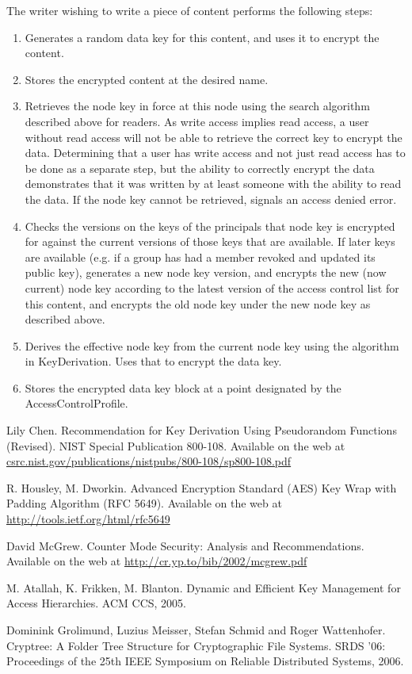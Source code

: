 The writer wishing to write a piece of content performs the following steps:
\begin{enumerate}
\item Generates a random data key for this content, and uses it to encrypt the content.
\item Stores the encrypted content at the desired name.
\item Retrieves the node key in force at this node using the search
  algorithm described above for readers. As write access implies read
  access, a user without read access will not be able to retrieve the
  correct key to encrypt the data. Determining that a user has write
  access and not just read access has to be done as a separate step,
  but the ability to correctly encrypt the data demonstrates that it
  was written by at least someone with the ability to read the
  data. If the node key cannot be retrieved, signals an access denied
  error.
\item Checks the versions on the keys of the principals that node key
  is encrypted for against the current versions of those keys that are
  available. If later keys are available (e.g. if a group has had a
  member revoked and updated its public key), generates a new node key
  version, and encrypts the new (now current) node key according to
  the latest version of the access control list for this content, and
  encrypts the old node key under the new node key as described above.
\item Derives the effective node key from the current node key using the algorithm in KeyDerivation. Uses that to encrypt the data key.
\item Stores the encrypted data key block at a point designated by the AccessControlProfile. 
\end{enumerate}


\newpage

\begin{thebibliography}{}

 Lily Chen. Recommendation for Key Derivation Using Pseudorandom Functions (Revised). NIST Special Publication 800-108. Available on the web at \url{csrc.nist.gov/publications/nistpubs/800-108/sp800-108.pdf}

 R. Housley, M. Dworkin. Advanced Encryption Standard (AES) Key Wrap with Padding Algorithm (RFC 5649). Available on the web at \url{http://tools.ietf.org/html/rfc5649}

 David McGrew. Counter Mode Security: Analysis and Recommendations. Available on the web at \url{http://cr.yp.to/bib/2002/mcgrew.pdf}

 M. Atallah, K. Frikken, M. Blanton. Dynamic and Efficient Key Management for Access Hierarchies. ACM CCS, 2005.

 Dominink Grolimund, Luzius Meisser, Stefan Schmid and Roger Wattenhofer. Cryptree: A Folder Tree Structure for Cryptographic File Systems. SRDS '06: Proceedings of the 25th IEEE Symposium on Reliable Distributed Systems, 2006.

\end{thebibliography}




